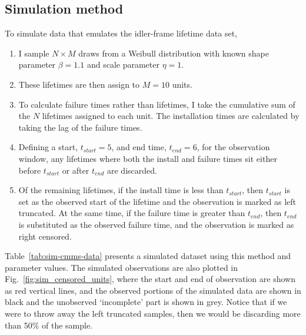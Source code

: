 \subsection{Simulation method} \label{subsec:sim-method-weibull}

To simulate data that emulates the idler-frame lifetime data set, 
\begin{enumerate}
    \item I sample $N \times M$ draws from a Weibull distribution with known shape parameter $\beta = 1.1$ and scale parameter $\eta = 1$.
    \item These lifetimes are then assign to $M = 10$ units.
    \item To calculate failure times rather than lifetimes, I take the cumulative sum of the $N$ lifetimes assigned to each unit. The installation times are calculated by taking the lag of the failure times.
    \item Defining a start, $t_{start} = 5$, and end time, $t_{end} = 6$, for the observation window, any lifetimes where both the install and failure times sit either before $t_{start}$ or after $t_{end}$ are discarded.
    \item Of the remaining lifetimes, if the install time is less than $t_{start}$, then $t_{start}$ is set as the observed start of the lifetime and the observation is marked as left truncated. At the same time, if the failure time is greater than $t_{end}$, then $t_{end}$ is substituted as the observed failure time, and the observation is marked as right censored.
\end{enumerate}
Table~\ref{tab:sim-cmms-data} presents a simulated dataset using this method and parameter values. The simulated observations are also plotted in Fig.~\ref{fig:sim_censored_units}, where the start and end of observation are shown as red vertical lines, and the observed portions of the simulated data are shown in black and the unobserved `incomplete' part is shown in grey. Notice that if we were to throw away the left truncated samples, then we would be discarding more than 50\% of the sample.

